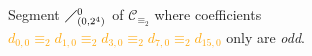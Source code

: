 
\begin{figure}[htb]

    \noindent{}

    \captionsetup{singlelinecheck=off}
    \caption[Segment $\diagup_{(0,2^{4})}^{0}$ of $\mathcal{C}_{\equiv_{2}}$ ]{ 
        Segment $\diagup_{(0,2^{4})}^{0}$ of $\mathcal{C}_{\equiv_{2}}$
        where coefficients
        \textcolor{orange}{
            $   d_{0,0}\equiv_{2}
                d_{1,0}\equiv_{2}
                d_{3,0}\equiv_{2}
                d_{7,0}\equiv_{2}
                d_{15,0}$} only are \emph{odd}.}

    \label{fig:catalan-first-column}

\end{figure}
